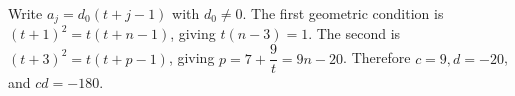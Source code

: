 Write $a_j=d_0(t+j-1)$ with $d_0\ne0$. The first geometric condition is $(t+1)^2=t(t+n-1)$, giving $t(n-3)=1$. The second is $(t+3)^2=t(t+p-1)$, giving $p = 7 + \dfrac{9}{t} = 9 n - 20$. Therefore $c=9,d=-20$, and $\boxed{cd=-180}$.
